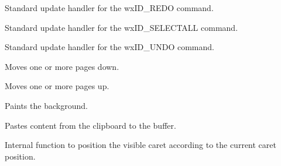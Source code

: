 \label{wxrichtextctrlonupdateredo}


Standard update handler for the wxID\_REDO command.

\label{wxrichtextctrlonupdateselectall}


Standard update handler for the wxID\_SELECTALL command.

\label{wxrichtextctrlonupdateundo}


Standard update handler for the wxID\_UNDO command.

\label{wxrichtextctrlpagedown}


Moves one or more pages down.

\label{wxrichtextctrlpageup}


Moves one or more pages up.

\label{wxrichtextctrlpaintbackground}


Paints the background.

\label{wxrichtextctrlpaste}


Pastes content from the clipboard to the buffer.

\label{wxrichtextctrlpositioncaret}


Internal function to position the visible caret according to the current caret position.

\label{wxrichtextctrlpositiontoxy}



